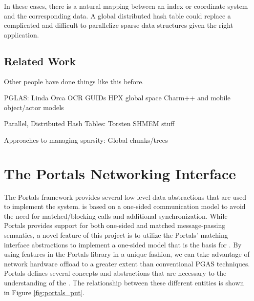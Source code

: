 In these cases, there is a natural mapping between an index or
coordinate system and the corresponding data. A global distributed
hash table could replace a complicated and difficult to parallelize
sparse data structures given the right application.

\subsection{Related Work}

Other people have done things like this before.

PGLAS:
Linda
Orca
OCR GUIDs
HPX global space
Charm++ and mobile object/actor models

Parallel, Distributed Hash Tables:
Torsten
SHMEM stuff

Approaches to managing sparsity:
Global chunks/trees

\section{The Portals Networking Interface}







The Portals framework provides several low-level data abstractions that
are used to implement the \pdht system. \pdht is based on a one-sided
communication model to avoid the need for matched/blocking calls and
additional synchronization. While Portals provides support for both
one-sided and matched message-passing semantics, a novel feature of
this project is to utilize the Portals' matching interface
abstractions to implement a one-sided model that is the basis for
\pdht. By using features in the Portals library in a unique fashion,
we can take advantage of network hardware offload  to a greater extent
than conventional PGAS techniques. Portals defines several concepts
and abstractions that are necessary to the understanding of the
\pdht. The relationship between these different entities is shown in
Figure \ref{fig:portals_put}.

